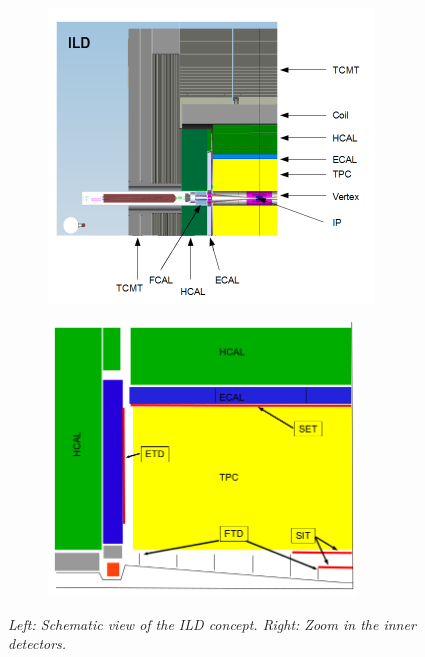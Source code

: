 \begin{figure}
\centering
\begin{subfigure}{0.5\textwidth}
    \includegraphics[width=0.95\textwidth]{graphics/ILD.png}

\end{subfigure}%
  \begin{subfigure}{0.5\textwidth}
\centering
    \includegraphics[width=0.9\textwidth]{graphics/ILDtracking.png}

\end{subfigure}
    \caption{\sl Left: Schematic view of the ILD concept. Right: Zoom in the inner detectors.}
    \label{fig:ILDScheme}
\end{figure}



